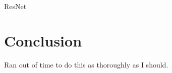 \documentclass[11pt]{article}
\begin{document}
\begin{subsection}{ResNet}



\end{subsection}






%
%
%
%
%


\section{Conclusion}
Ran out of time to do this as thoroughly as I should.
\end{document}
